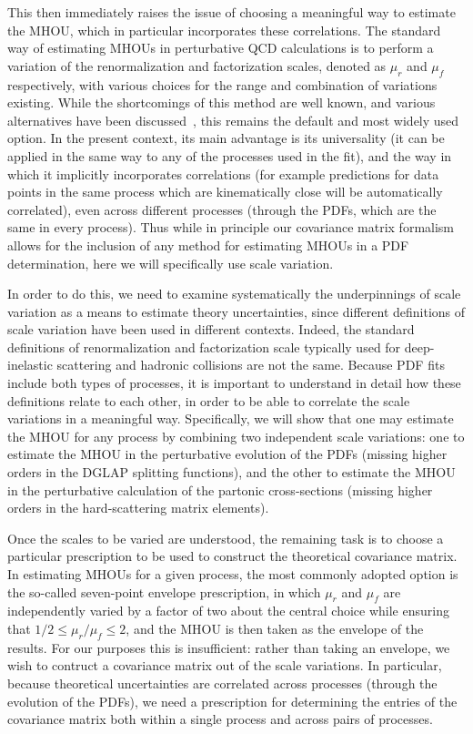 This then immediately raises the issue of choosing a meaningful way to
estimate the MHOU, which in particular incorporates these correlations.
%
The standard way of estimating MHOUs in perturbative QCD calculations is 
to perform a variation of the
renormalization and factorization scales, denoted as $\mu_r$ and $\mu_f$
respectively, with various choices for the range and combination of variations existing.
%
While the shortcomings of this method are well known, and various alternatives have been discussed~\cite{Cacciari:2011ze,David:2013gaa,Bagnaschi:2014wea},
this remains the default and most widely used option.
%
In the present context, its main advantage is its universality (it can be applied in the same way to any
of the processes used in the fit), and the way in which it implicitly incorporates correlations (for example predictions for data points in the same process which are kinematically close will be automatically correlated), even across different processes (through the PDFs, which are the same in every process).
%
Thus while in principle our covariance matrix formalism allows for the
inclusion of any method for estimating MHOUs in a PDF determination, here 
we will specifically use scale variation.

In order to do this, we need to examine systematically the underpinnings 
of scale variation as a means to estimate theory uncertainties, since 
different definitions of scale variation have been used in different contexts.
%
Indeed, the standard definitions of renormalization and
factorization scale typically used for deep-inelastic scattering and 
hadronic collisions are not the same.
%
Because  PDF fits include both types of processes,
it is important to understand in detail how these
definitions relate to each other, in order to be
able to correlate the scale variations in a meaningful
way.
%
Specifically, we will show that one may estimate the MHOU for any process 
by combining two independent scale variations: one
to estimate the MHOU in the perturbative evolution of the PDFs
(missing higher orders in the DGLAP splitting functions), and the other 
to estimate the MHOU in the perturbative calculation of the 
partonic cross-sections (missing
higher orders in the hard-scattering matrix elements).

Once the scales to be varied are understood, the remaining task
is to choose a particular prescription to be used to construct the 
theoretical covariance matrix.
%
In estimating MHOUs for a given process, the most commonly adopted option 
is the so-called seven-point envelope prescription, in which 
$\mu_r$ and $\mu_f$ are independently varied by a factor of two about
the central choice 
while ensuring that $1/2 \le \mu_r/\mu_f\le 2$, and the MHOU is then
taken as the envelope of the results. 
%
For our purposes this is insufficient: rather than taking an envelope,
we wish to contruct a covariance matrix out of the scale variations.
In particular, because theoretical uncertainties are correlated across processes (through the evolution of the PDFs), we need a prescription for determining the entries of the covariance matrix both within a single process and 
across pairs of processes. 
%

